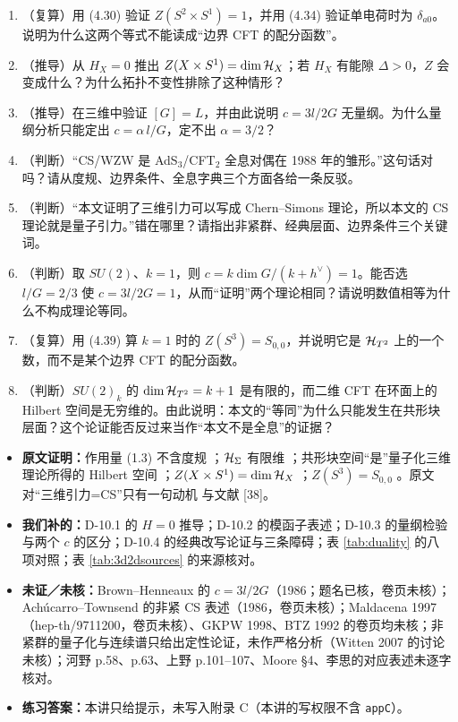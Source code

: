 \begin{enumerate}[leftmargin=*]
  \item （复算）用 (4.30) 验证 $Z(S^2\times S^1)=1$，并用 (4.34) 验证单电荷时为 $\delta_{a0}$。说明为什么这两个等式不能读成“边界 CFT 的配分函数”。
  \item （推导）从 $H_X=0$ 推出 $Z(X\times S^1)=\dim\mathcal{H}_X$；若 $H_X$ 有能隙 $\Delta>0$，$Z$ 会变成什么？为什么拓扑不变性排除了这种情形？
  \item （推导）在三维中验证 $[G]=L$，并由此说明 $c=3l/2G$ 无量纲。为什么量纲分析只能定出 $c=\alpha\,l/G$，定不出 $\alpha=3/2$？
  \item （判断）“CS/WZW 是 AdS$_3$/CFT$_2$ 全息对偶在 1988 年的雏形。”这句话对吗？请从度规、边界条件、全息字典三个方面各给一条反驳。
  \item （判断）“本文证明了三维引力可以写成 Chern--Simons 理论，所以本文的 CS 理论就是量子引力。”错在哪里？请指出非紧群、经典层面、边界条件三个关键词。
  \item （判断）取 $SU(2)$、$k=1$，则 $c=k\dim G/(k+h^\vee)=1$。能否选 $l/G=2/3$ 使 $c=3l/2G=1$，从而“证明”两个理论相同？请说明数值相等为什么不构成理论等同。
  \item （复算）用 (4.39) 算 $k=1$ 时的 $Z(S^3)=S_{0,0}$，并说明它是 $\mathcal{H}_{T^2}$ 上的一个数，而不是某个边界 CFT 的配分函数。
  \item （判断）$SU(2)_k$ 的 $\dim\mathcal{H}_{T^2}=k+1$ 是有限的，而二维 CFT 在环面上的 Hilbert 空间是无穷维的。由此说明：本文的“等同”为什么只能发生在共形块层面？这个论证能否反过来当作“本文不是全息”的证据？
\end{enumerate}

\begin{boundary}
\begin{itemize}[leftmargin=1.4em]
  \item \textbf{原文证明：}作用量 (1.3) 不含度规 ；$\mathcal{H}_\Sigma$ 有限维 ；共形块空间“是”量子化三维理论所得的 Hilbert 空间 ；$Z(X\times S^1)=\dim\mathcal{H}_X$ ；$Z(S^3)=S_{0,0}$ 。原文对“三维引力=CS”只有一句动机  与文献 [38]。
  \item \textbf{我们补的：}D-10.1 的 $H=0$ 推导；D-10.2 的模函子表述；D-10.3 的量纲检验与两个 $c$ 的区分；D-10.4 的经典改写论证与三条障碍；表 \ref{tab:duality} 的八项对照；表 \ref{tab:3d2dsources} 的来源核对。
  \item \textbf{未证／未核：}Brown--Henneaux 的 $c=3l/2G$（1986；题名已核，卷页未核）；Achúcarro--Townsend 的非紧 CS 表述（1986，卷页未核）；Maldacena 1997（hep-th/9711200，卷页未核）、GKPW 1998、BTZ 1992 的卷页均未核；非紧群的量子化与连续谱只给出定性论证，未作严格分析（Witten 2007 的讨论未核）；河野 p.58、p.63、上野 p.101--107、Moore \S4、李思的对应表述未逐字核对。
  \item \textbf{练习答案：}本讲只给提示，未写入附录 C（本讲的写权限不含 \texttt{appC}）。
\end{itemize}
\end{boundary}
